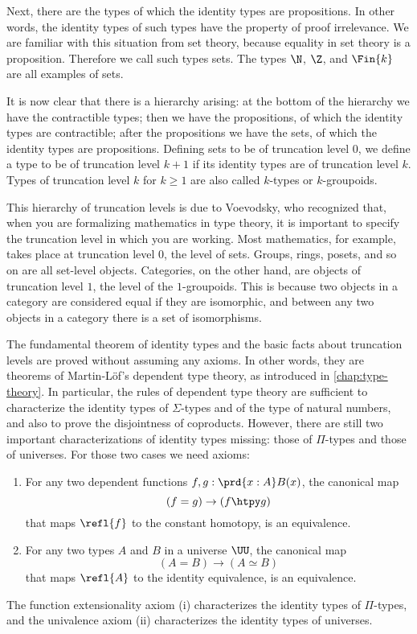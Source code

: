 Next, there are the types of which the identity types are propositions. In other words, the identity types of such types have the property of proof irrelevance. We are familiar with this situation from set theory, because equality in set theory is a proposition. Therefore we call such types sets. The types $\N$, $\Z$, and $\Fin{k}$ are all examples of sets.

It is now clear that there is a hierarchy arising: at the bottom of the hierarchy we have the contractible types; then we have the propositions, of which the identity types are contractible; after the propositions we have the sets, of which the identity types are propositions. Defining sets to be of truncation level $0$, we define a type to be of truncation level $k+1$ if its identity types are of truncation level $k$. Types of truncation level $k$ for $k\geq 1$ are also called $k$-types or $k$-groupoids.

This hierarchy of truncation levels is due to Voevodsky, who recognized that, when you are formalizing mathematics in type theory, it is important to specify the truncation level in which you are working. Most mathematics, for example, takes place at truncation level $0$, the level of sets. Groups, rings, posets, and so on are all set-level objects. Categories, on the other hand, are objects of truncation level $1$, the level of the $1$-groupoids. This is because two objects in a category are considered equal if they are isomorphic, and between any two objects in a category there is a set of isomorphisms.

The fundamental theorem of identity types and the basic facts about truncation levels are proved without assuming any axioms. In other words, they are theorems of Martin-L\"of's dependent type theory, as introduced in \cref{chap:type-theory}. In particular, the rules of dependent type theory are sufficient to characterize the identity types of $\Sigma$-types and of the type of natural numbers, and also to prove the disjointness of coproducts. However, there are still two important characterizations of identity types missing: those of $\Pi$-types and those of universes. For those two cases we need axioms:
\begin{enumerate}
\item For any two dependent functions $f,g:\prd{x:A}B(x)$, the canonical map
  \begin{equation*}
    (f=g)\to (f\htpy g)
  \end{equation*}
  that maps $\refl{f}$ to the constant homotopy, is an equivalence.
\item For any two types $A$ and $B$ in a universe $\UU$, the canonical map
  \begin{equation*}
    (A=B)\to (A\simeq B)
  \end{equation*}
  that maps $\refl{A}$ to the identity equivalence, is an equivalence.
\end{enumerate}
The function extensionality axiom (i) characterizes the identity types of $\Pi$-types, and the univalence axiom (ii) characterizes the identity types of universes.

